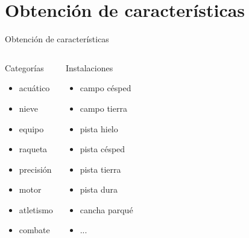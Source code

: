 \section{Obtención de características}
\begin{frame}
\end{frame}

\begin{frame}{Obtención de características}
 \begin{columns}[t]
  \begin{block}{Categorías}
   	\begin{itemize}
	\item acuático
	\item nieve
	\item equipo
	\item raqueta
	\item precisión
	\item motor
	\item atletismo
	\item combate
	\end{itemize}
  \end{block}
  \begin{block}{Instalaciones}
  	\begin{itemize}
	\item campo césped
	\item campo tierra
	\item pista hielo
	\item pista césped
	\item pista tierra
	\item pista dura
	\item cancha parqué
	\item ...
	\end{itemize}
  \end{block}
 \end{columns}
\end{frame}

